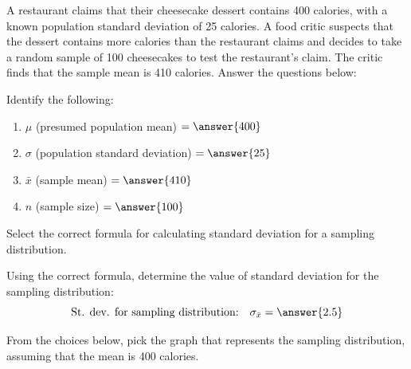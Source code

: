 \documentclass{ximera}
\begin{document}
\begin{problem}\label{pr:cheesecake}
A restaurant claims that their cheesecake dessert contains 400 calories, with a known population standard deviation of 25 calories. A food critic suspects that the dessert contains more calories than the restaurant claims and decides to take a random sample of 100 cheesecakes to test the restaurant's claim. The critic finds that the sample mean is 410 calories. Answer the questions below:

\begin{question} 
Identify the following:
\begin{enumerate}
    \item $\mu$ (presumed population mean) $= \answer{400}$
    \item $\sigma$ (population standard deviation) $= \answer{25}$
    \item $\bar{x}$ (sample mean) $=\answer{410}$
    \item $n$ (sample size) $= \answer{100}$
\end{enumerate}
\end{question}

\begin{question} Select the correct formula for calculating standard deviation for a sampling distribution.

\begin{multipleChoice}  
\end{multipleChoice} 

\end{question}

\begin{question} Using the correct formula, determine the value of standard deviation for the sampling distribution:
$$\mbox{St. dev. for sampling distribution:}\quad\sigma_{\bar{x}}= \answer{2.5}$$
\end{question}

\begin{question} From the choices below, pick the graph that represents the sampling distribution, assuming that the mean is 400 calories. %


\end{question}
\end{problem}
\end{document}
